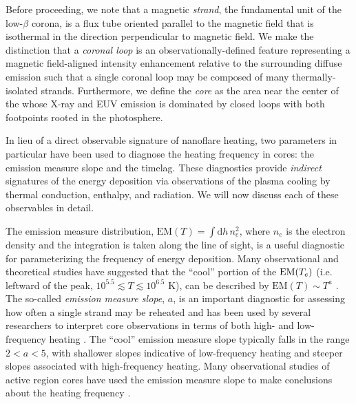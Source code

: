 Before proceeding, we note that a magnetic \textit{strand}, the fundamental unit of the low-$\beta$ corona, is a flux tube oriented parallel to the magnetic field that is isothermal in the direction perpendicular to magnetic field. We make the distinction that a \textit{coronal loop} is an observationally-defined feature representing a magnetic field-aligned intensity enhancement relative to the surrounding diffuse emission such that a single coronal loop may be composed of many thermally-isolated strands. Furthermore, we define the \AR{} \textit{core} as the area near the center of the \AR{} whose X-ray and EUV emission is dominated by closed loops with both footpoints rooted in the photosphere.

In lieu of a direct observable signature of nanoflare heating, two parameters in particular have been used to diagnose the heating frequency in \AR{} cores: the emission measure slope and the timelag. These diagnostics provide \textit{indirect} signatures of the energy deposition via observations of the plasma cooling by thermal conduction, enthalpy, and radiation. We will now discuss each of these observables in detail.

The emission measure distribution, $\mathrm{EM}(T)=\int\mathrm{d}h\,n_e^2$, where $n_e$ is the electron density and the integration is taken along the line of sight, is a useful diagnostic for parameterizing the frequency of energy deposition. Many observational and theoretical studies have suggested that the ``cool'' portion of the $\textup{EM}(T_e)$ (i.e. leftward of the peak, $10^{5.5}\lesssim T\lesssim10^{6.5}$ K), can be described by $\mathrm{EM}(T)\sim T^a$ \citep{jordan_structure_1976,cargill_implications_1994,cargill_nanoflare_2004}. The so-called \textit{emission measure slope}, $a$, is an important diagnostic for assessing how often a single strand may be reheated and has been used by several researchers to interpret \AR{} core observations in terms of both high- and low-frequency heating \citep[see Table 3 of][and references therein]{bradshaw_diagnosing_2012}. The ``cool'' emission measure slope typically falls in the range $2<a<5$, with shallower slopes indicative of low-frequency heating and steeper slopes associated with high-frequency heating. Many observational studies of active region cores have used the emission measure slope to make conclusions about the heating frequency \citep[e.g.][]{tripathi_emission_2011,warren_constraints_2011,winebarger_using_2011,schmelz_cold_2012,warren_systematic_2012,del_zanna_evolution_2015}.

